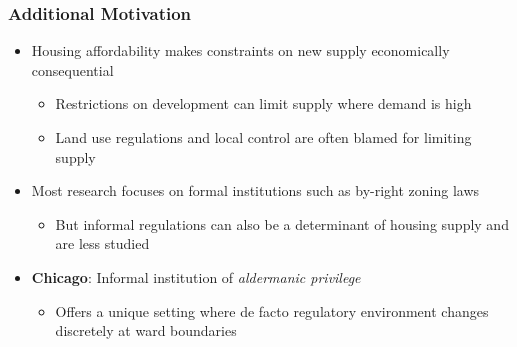 \begin{frame}
	\frametitle{Additional Motivation}
	\begin{itemize}
		\item Housing affordability makes constraints on new supply economically consequential
		\begin{itemize}
			\item Restrictions on development can limit supply where demand is high
			\item Land use regulations and local control are often blamed for limiting supply
		\end{itemize}
		\item Most research focuses on formal institutions such as by-right zoning laws
		\begin{itemize}
			\item But informal regulations can also be a determinant of housing supply and are less studied
		\end{itemize}
		\item \textbf{Chicago}: Informal institution of \textit{aldermanic privilege}
		\begin{itemize}
			\item Offers a unique setting where de facto regulatory environment changes discretely at ward boundaries
		\end{itemize}
	\end{itemize}
\end{frame}

